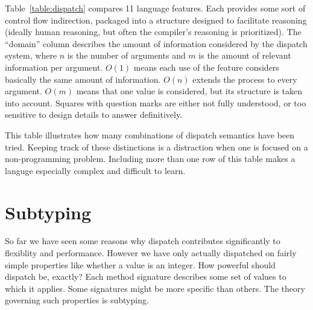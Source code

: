 
Table~\ref{table:dispatch} compares 11 language features.
Each provides some sort of control flow indirection, packaged into a
structure designed to facilitate reasoning (ideally human reasoning,
but often the compiler's reasoning is prioritized).
The ``domain'' column describes the amount of information considered
by the dispatch system, where $n$ is the number of arguments and
$m$ is the amount of relevant information per argument.
$O(1)$ means each use of the feature considers basically the same
amount of information.
$O(n)$ extends the process to every argument.
$O(m)$ means that one value is considered, but its structure is
taken into account.
Squares with question marks are either not fully understood, or too
sensitive to design details to answer definitively.


This table illustrates how many combinations of dispatch semantics have
been tried.
Keeping track of these distinctions is a distraction when one is focused
on a non-programming problem.
Including more than one row of this table makes a languge especially
complex and difficult to learn.



\section{Subtyping}

So far we have seen some reasons why dispatch contributes significantly
to flexiblity and performance.
However we have only actually dispatched on fairly simple properties like
whether a value is an integer.
How powerful should dispatch be, exactly?
Each method signature describes some set of values to which it applies.
Some signatures might be more specific than others.
The theory governing such properties is subtyping.



